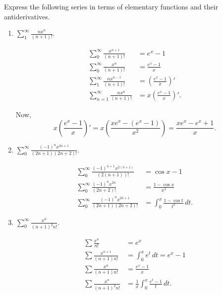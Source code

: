 \documentclass[../hw3]{subfiles}
\begin{document}
\begin{problem}
Express the following series in terms of  elementary functions and their antiderivatives.
\end{problem}
\begin{enumerate}[label=\alph*)]
	\item $\sum_{1}^{\infty} \frac{nx^n}{(n+1)!}$.

	      \begin{align*}
		      \sum_{0}^{\infty} \frac{x^{n + 1}}{(n+1)!} & = e^x - 1                          \\
		      \sum_{0}^{\infty} \frac{x^n}{(n+1)!}       & = \frac{e^x-1}{x}                  \\
		      \sum_{1}^{\infty} \frac{nx^{n-1}}{(n+1)!}  & = \left( \frac{e^x-1}{x} \right)'  \\
		      \sum_{n=1}^{\infty} \frac{nx^n}{(n+1)!}    & = x\left( \frac{e^x-1}{x} \right)'
		      .\end{align*}

	      Now, \[
		      x\left( \frac{e^x -1}{x} \right)' = x\left( \frac{xe^x -(e^x -1)}{x^2} \right) = \frac{xe^x -e^x +1}{x}
		      .\]

	\item $\sum_{0}^{\infty} \frac{(-1)^n x^{2n+1}}{(2n+1)(2n+2)!}$.

	      \begin{align*}
		      \sum_{0}^{\infty} \frac{(-1)^{n+1}x^{2(n+1)}}{(2(n+1))!} & = \cos{x}-1                                \\
		      \sum_{0}^{\infty} \frac{(-1)^n x^{2n}}{(2n+2)!}          & = \frac{1-\cos{x} }{x^2}                   \\
		      \sum_{0}^{\infty} \frac{(-1)^n x^{2n+1}}{(2n+1)(2n+2)!}  & = \int_{0}^{x} \frac{1-\cos{t} }{t^2} \,dt
		      .\end{align*}

	\item $\sum_{0}^{\infty} \frac{x^n}{(n+1)^2 n!}$.

	      \begin{align*}
		      \sum \frac{x^n}{n!}          & = e^x                                           \\
		      \sum \frac{x^{n+1}}{(n+1)n!} & = \int_{0}^{x} e^t \,dt = e^x-1                 \\
		      \sum \frac{x^n}{(n+1)n!}     & = \frac{e^x -1}{x}                              \\
		      \sum \frac{x^n}{(n+1)^2 n!}  & = \frac{1}{x}\int_{0}^{x} \frac{e^t-1}{t}  \,dt
		      .\end{align*}
\end{enumerate}
\end{document}
